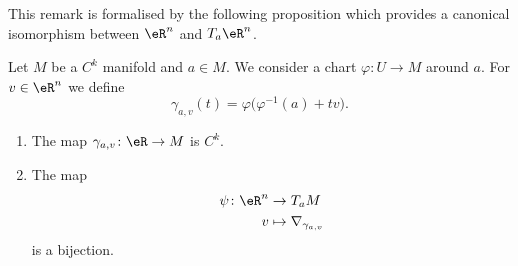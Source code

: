 This remark is formalised by the following proposition which provides a canonical isomorphism between \( \eR^n\) and \( T_a\eR^n\).

\begin{proposition}
    Let \( M\) be a \( C^k\) manifold and \( a\in M\). We consider a chart \( \varphi\colon U\to M\) around \( a\). For \( v\in \eR^n\) we define
    \begin{equation}
        \gamma_{a,v}(t)=\varphi\big( \varphi^{-1}(a)+tv \big).
    \end{equation}
    \begin{enumerate}
        \item
            The map \( \gamma_{a,v}\colon \eR\to M\) is \( C^k\).
        \item
            The map
            \begin{equation}
                \begin{aligned}
                    \psi\colon \eR^n&\to T_aM \\
                    v&\mapsto \nabla_{\gamma_{a,v}} 
                \end{aligned}
            \end{equation}
            is a bijection.
    \end{enumerate}
\end{proposition}


